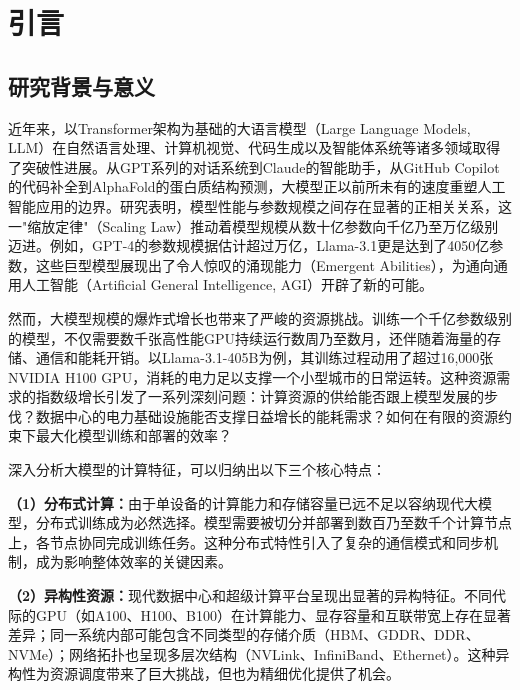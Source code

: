 
\chapter{引言}

\section{研究背景与意义}

近年来，以Transformer架构为基础的大语言模型（Large Language Models, LLM）在自然语言处理、计算机视觉、代码生成以及智能体系统等诸多领域取得了突破性进展\cite{vaswani2017attention,brown2020language,openai2023gpt4}。从GPT系列的对话系统到Claude的智能助手，从GitHub Copilot的代码补全到AlphaFold的蛋白质结构预测，大模型正以前所未有的速度重塑人工智能应用的边界。研究表明，模型性能与参数规模之间存在显著的正相关关系\cite{kaplan2020scalinglaws}，这一"缩放定律"（Scaling Law）推动着模型规模从数十亿参数向千亿乃至万亿级别迈进。例如，GPT-4的参数规模据估计超过万亿\cite{openai2023gpt4}，Llama-3.1更是达到了4050亿参数\cite{dubey2024llama3}，这些巨型模型展现出了令人惊叹的涌现能力（Emergent Abilities），为通向通用人工智能（Artificial General Intelligence, AGI）开辟了新的可能。

然而，大模型规模的爆炸式增长也带来了严峻的资源挑战。训练一个千亿参数级别的模型，不仅需要数千张高性能GPU持续运行数周乃至数月，还伴随着海量的存储、通信和能耗开销\cite{patterson2021carbon}。以Llama-3.1-405B为例，其训练过程动用了超过16,000张NVIDIA H100 GPU\cite{dubey2024llama3}，消耗的电力足以支撑一个小型城市的日常运转。这种资源需求的指数级增长引发了一系列深刻问题：计算资源的供给能否跟上模型发展的步伐？数据中心的电力基础设施能否支撑日益增长的能耗需求？如何在有限的资源约束下最大化模型训练和部署的效率？

深入分析大模型的计算特征，可以归纳出以下三个核心特点：

\textbf{（1）分布式计算：}由于单设备的计算能力和存储容量已远不足以容纳现代大模型，分布式训练成为必然选择\cite{narayanan2021efficient}。模型需要被切分并部署到数百乃至数千个计算节点上，各节点协同完成训练任务。这种分布式特性引入了复杂的通信模式和同步机制，成为影响整体效率的关键因素。

\textbf{（2）异构性资源：}现代数据中心和超级计算平台呈现出显著的异构特征\cite{athlur2022varuna}。不同代际的GPU（如A100、H100、B100）在计算能力、显存容量和互联带宽上存在显著差异；同一系统内部可能包含不同类型的存储介质（HBM、GDDR、DDR、NVMe）；网络拓扑也呈现多层次结构（NVLink、InfiniBand、Ethernet）。这种异构性为资源调度带来了巨大挑战，但也为精细优化提供了机会。


